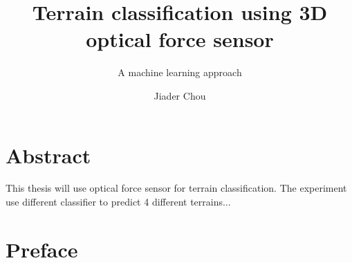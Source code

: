 \documentclass[USenglish]{ifimaster}  %
\title{Terrain classification using 3D optical force sensor}        %
\subtitle{A machine learning approach}
\author{Jiader Chou}                      %
\begin{document}
\ififorside{}
\frontmatter{}
\maketitle{}

\frontmatter{}
\chapter*{Abstract}                   %
This thesis will use optical force sensor for terrain classification. The experiment use different classifier to predict 4 different terrains...
\tableofcontents{}
\listoffigures{}
\listoftables{}

\chapter*{Preface}                    %

\mainmatter{}
\end{document}
